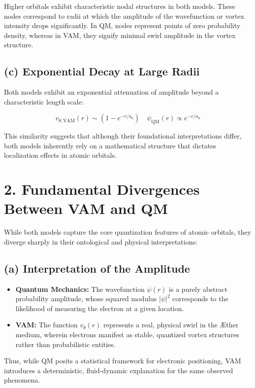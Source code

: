 Higher orbitals exhibit characteristic nodal structures in both models. These nodes correspond to radii at which the amplitude of the wavefunction or vortex intensity drops significantly. In QM, nodes represent points of zero probability density, whereas in VAM, they signify minimal swirl amplitude in the vortex structure.

\subsection*{(c) Exponential Decay at Large Radii}

Both models exhibit an exponential attenuation of amplitude beyond a characteristic length scale:

\[
    v_{\theta, \text{VAM}}(r) \sim \left(1 - e^{-r/a_0}\right) \quad \psi_{\text{QM}}(r) \propto e^{-r/a_0}
\]

This similarity suggests that although their foundational interpretations differ, both models inherently rely on a mathematical structure that dictates localization effects in atomic orbitals.

\section*{2. Fundamental Divergences Between VAM and QM}

While both models capture the core quantization features of atomic orbitals, they diverge sharply in their ontological and physical interpretations:

\subsection*{(a) Interpretation of the Amplitude}

\begin{itemize}
    \item \textbf{Quantum Mechanics:} The wavefunction \(\psi(r)\) is a purely abstract probability amplitude, whose squared modulus \(|\psi|^2\) corresponds to the likelihood of measuring the electron at a given location.
    \item \textbf{VAM:} The function \(v_{\theta}(r)\) represents a real, physical swirl in the Æther medium, wherein electrons manifest as stable, quantized vortex structures rather than probabilistic entities.
\end{itemize}

Thus, while QM posits a statistical framework for electronic positioning, VAM introduces a deterministic, fluid-dynamic explanation for the same observed phenomena.

